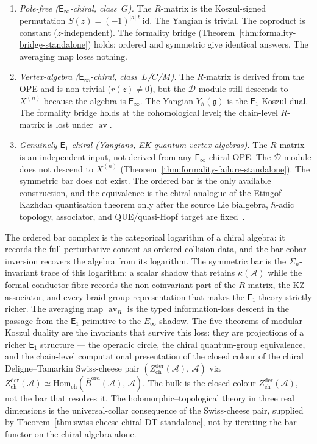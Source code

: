 \documentclass[11pt,reqno]{amsart}
\theoremstyle{definition}
\theoremstyle{remark}
\newcommand{\cA}{\mathcal{A}}
\newcommand{\cD}{\mathcal{D}}
\newcommand{\Eone}{\mathsf{E}_{1}}
\newcommand{\Einf}{\mathsf{E}_{\infty}}
\DeclareMathOperator{\av}{av}
\newcommand{\fg}{\mathfrak{g}}
\newcommand{\Barord}{\overline{B}^{\mathrm{ord}}}
\newcommand{\id}{\mathrm{id}}
\numberwithin{equation}{section}
\begin{document}
\begin{enumerate}[label=\textup{(Tier \alph*)}]
\item \emph{Pole-free ($\Einf$-chiral, class~$G$).}
  The $R$-matrix is the Koszul-signed permutation
  $S(z) = (-1)^{|a||b|}\id$. The Yangian is trivial. The
  coproduct is constant ($z$-independent). The formality bridge
  (Theorem~\ref{thm:formality-bridge-standalone}) holds: ordered
  and symmetric give identical answers. The averaging map loses
  nothing.

\item \emph{Vertex-algebra ($\Einf$-chiral, class~$L$/$C$/$M$).}
  The $R$-matrix is derived from the OPE and is non-trivial
  ($r(z) \neq 0$), but the $\cD$-module still descends to
  $X^{(n)}$ because the algebra is $\Einf$. The Yangian
  $Y_\hbar(\fg)$ is the $\Eone$ Koszul dual. The formality
  bridge holds at the cohomological level; the chain-level
  $R$-matrix is lost under $\av$.

\item \emph{Genuinely $\Eone$-chiral (Yangians, EK quantum
  vertex algebras).}
  The $R$-matrix is an independent input, not derived from any
  $\Einf$-chiral OPE. The $\cD$-module does not descend to
  $X^{(n)}$ (Theorem~\ref{thm:formality-failure-standalone}).
  The symmetric bar does not exist. The ordered bar is the only
  available construction, and the equivalence is the chiral
  analogue of the Etingof--Kazhdan quantisation theorem only after
  the source Lie bialgebra, \(\hbar\)-adic topology, associator, and
  QUE/quasi-Hopf target are fixed~\cite{EK96, EK00}.
\end{enumerate}

\bigskip

\noindent
The ordered bar complex is the categorical logarithm of a chiral
algebra: it records the full perturbative content as ordered
collision data, and the bar-cobar inversion recovers the algebra
from its logarithm. The symmetric bar is the $\Sigma_n$-invariant
trace of this logarithm: a scalar shadow that retains
$\kappa(\cA)$ while the formal conductor fibre records the
non-coinvariant part of the $R$-matrix, the KZ associator, and every
braid-group representation that makes the $\Eone$ theory strictly
richer. The averaging map $\av_R$ is the typed information-loss
descent in the passage from the $\Eone$ primitive to the
$E_\infty$ shadow. The five theorems of modular Koszul duality are
the invariants that survive this loss: they are projections of a
richer $\Eone$ structure --- the operadic circle, the chiral
quantum-group equivalence, and the chain-level computational
presentation of the closed colour of the chiral
Deligne--Tamarkin Swiss-cheese pair
$(Z^{\mathrm{der}}_{\mathrm{ch}}(\cA),\, \cA)$ via
$Z^{\mathrm{der}}_{\mathrm{ch}}(\cA) \simeq
\mathrm{Hom}_{\mathrm{ch}}(\Barord(\cA),\, \cA)$. The bulk is the
closed colour $Z^{\mathrm{der}}_{\mathrm{ch}}(\cA)$, not the bar
that resolves it. The holomorphic--topological theory in three
real dimensions is the universal-collar consequence of the
Swiss-cheese pair, supplied by
Theorem~\ref{thm:swiss-cheese-chiral-DT-standalone}, not by
iterating the bar functor on the chiral algebra alone.
\end{document}
